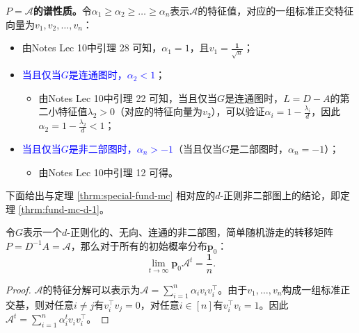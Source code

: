 \documentclass[lang=cn,newtx,10pt,scheme=chinese,chinesefont=nofont,citestyle=gb7714-2015, bibstyle=gb7714-2015]{elegantbook}
\begin{document}
\begin{refsection}
    \vspace{0.2cm}
    \textbf{$P=\mathcal{A}$的谱性质。}令$\alpha_1\ge \alpha_2\ge \dots\ge \alpha_n$表示$\mathcal{A}$的特征值，对应的一组标准正交特征向量为$v_1,v_2,\dots,v_n$：
    \begin{itemize}
        \item 由Notes Lec 10中引理 28 可知，$\alpha_1=1$，且$v_1=\frac{\bm{1}}{\sqrt{n}}$；
        \item \textcolor{blue}{当且仅当$G$是连通图时，$\alpha_2<1$}；
            \begin{itemize}
                \item 由Notes Lec 10中引理 22 可知，当且仅当$G$是连通图时，$L=D-A$的第二小特征值$\lambda_2>0$（对应的特征向量为$v_2$），可以验证$\alpha_i=1-\frac{\lambda_i}{d}$，因此$\alpha_2=1-\frac{\lambda_2}{d}<1$；
            \end{itemize}
        \item \textcolor{blue}{当且仅当$G$是非二部图时，$\alpha_n>-1$}（当且仅当$G$是二部图时，$\alpha_n=-1$）；
            \begin{itemize}
                \item 由Notes Lec 10中引理 12 可得。
            \end{itemize}
        \end{itemize}

    \vspace{0.25cm}
    下面给出与定理 \ref{thrm:special-fund-mc} 相对应的$d$-正则非二部图上的结论，即定理 \ref{thrm:fund-mc-d-1}。
            
    \begin{theorem}
        \label{thrm:fund-mc-d-1}
        令$G$表示一个$d$-正则化的、无向、连通的非二部图，简单随机游走的转移矩阵$P=D^{-1}A=\mathcal{A}$，那么对于所有的初始概率分布$\bm{p}_0$：
        \[
            \lim_{t \to \infty} \bm{p}_0\mathcal{A}^t  = \frac{\bm{1}}{n}.
        \]
    \end{theorem}

    \begin{proof}
                    
        $\mathcal{A}$的特征分解可以表示为$\mathcal{A}=\sum_{i=1}^n{\alpha_iv_iv_i^{\top}}$。由于$v_1,\dots,v_n$构成一组标准正交基，则对任意$i\ne j$有$v_i^{\top}v_j=0$，对任意$i\in[n]$有$v_i^{\top}v_i=1$。因此$\mathcal{A}^t=\sum_{i=1}^n{\alpha_i^tv_iv_i^{\top}}$。


\end{proof}
\end{refsection}
\end{document}
